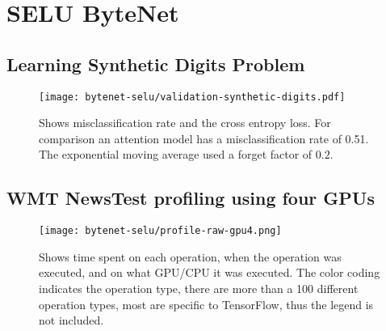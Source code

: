 \clearpage

\section{SELU ByteNet}
\label{appendix:result:bytenet-selu}
\subsection{Learning Synthetic Digits Problem}
\begin{figure}[h]
    \centering
    \texttt{[image: bytenet-selu/validation-synthetic-digits.pdf]}
    \caption{Shows misclassification rate and the cross entropy loss. For comparison an attention model has a misclassification rate of 0.51. The exponential moving average used a forget factor of $0.2$.}
\end{figure}

\clearpage
\subsection{WMT NewsTest profiling using four GPUs}
\begin{figure}[h]
    \centering
    \texttt{[image: bytenet-selu/profile-raw-gpu4.png]}
    \caption{Shows time spent on each operation, when the operation was executed, and on what GPU/CPU it was executed. The color coding indicates the operation type, there are more than a 100 different operation types, most are specific to TensorFlow, thus the legend is not included.}
\end{figure}